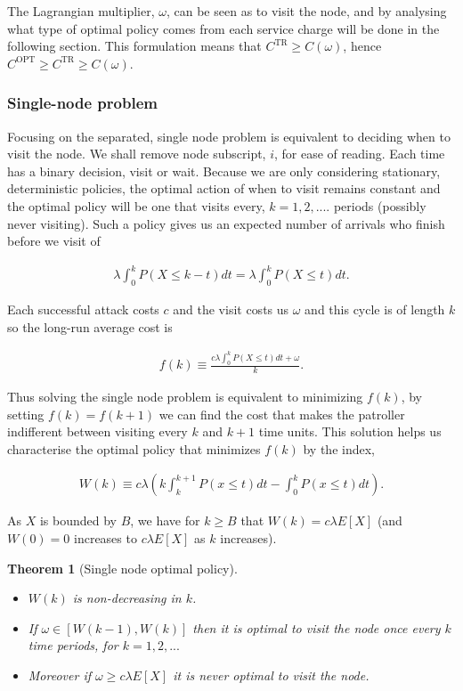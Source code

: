 \documentclass[a4paper,10pt]{article}
\newtheorem{theorem}{Theorem}[section]
\theoremstyle{definition}
\theoremstyle{definition}
\theoremstyle{remark}
\theoremstyle{definition}
\begin{document}
The Lagrangian multiplier, $\omega$, can be seen as  to visit the node, and by analysing what type of optimal policy comes from each service charge will be done in the following section. This formulation means that $C^{\text{TR}} \geq C(\omega)$, hence $C^{\text{OPT}} \geq C^{\text{TR}} \geq C(\omega)$.

\subsubsection{Single-node problem}

Focusing on the separated, single node problem is equivalent to deciding when to visit the node. We shall remove node subscript, $i$, for ease of reading. Each time has a binary decision, visit or wait. Because we are only considering stationary, deterministic policies, the optimal action of when to visit remains constant and the optimal policy will be one that visits every, $k=1,2,....$ periods (possibly never visiting). Such a policy gives us an expected number of arrivals who finish before we visit of

\begin{align*}
\lambda \int_{0}^{k} P(X \leq k-t) dt= \lambda \int_{0}^{k} P(X \leq t) dt.
\end{align*}

Each successful attack costs $c$ and the visit costs us $\omega$ and this cycle is of length $k$ so the long-run average cost is

\begin{align*}
f(k) \equiv \frac{c \lambda \int_{0}^{k} P(X \leq t) dt + \omega}{k}.
\end{align*}

Thus solving the single node problem is equivalent to minimizing $f(k)$, by setting $f(k) = f(k+1)$ we can find the cost that makes the patroller indifferent between visiting every $k$ and $k+1$ time units. This solution helps us characterise the optimal policy that minimizes $f(k)$ by the index,

\begin{align*}
W(k) \equiv c \lambda \left( k \int_{k}^{k+1} P(x \leq t) dt - \int_{0}^{k} P(x \leq t) dt \right).
\end{align*}

As $X$ is bounded by $B$, we have for $k \geq B$ that $W(k)= c \lambda E[X]$ (and $W(0)=0$ increases to $c \lambda E[X]$ as $k$ increases).

\begin{theorem}[Single node optimal policy]
\label{Theorem:Single node optimal policy}
\begin{itemize}
\item[a)] $W(k)$ is non-decreasing in $k$.
\item[b)] If $\omega \in [W(k-1),W(k)]$ then it is optimal to visit the node once every $k$ time periods, for $k=1,2,...$
\item[c)] Moreover if $\omega \geq c \lambda E[X]$ it is never optimal to visit the node.
\end{itemize}
\end{theorem}
\end{document}

